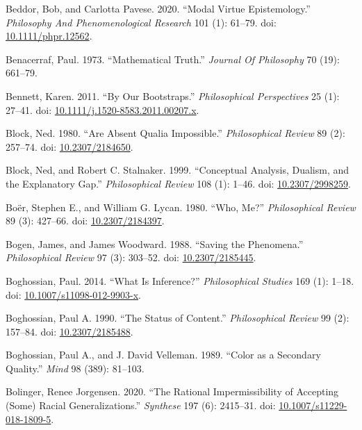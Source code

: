 \documentclass[
  10pt,
  letterpaper,
  DIV=11,
  numbers=noendperiod,
  twoside]{scrartcl}
\newlength{\cslhangindent}
\newenvironment{CSLReferences}[2] %
 {\begin{list}{}{%
  \setlength{\itemindent}{0pt}
  \setlength{\leftmargin}{0pt}
  \setlength{\parsep}{0pt}
  \ifodd #1
   \setlength{\leftmargin}{\cslhangindent}
   \setlength{\itemindent}{-1\cslhangindent}
  \fi
  \setlength{\itemsep}{#2\baselineskip}}}
 {\end{list}}
\begin{document}
\begin{CSLReferences}{1}{0}
Beddor, Bob, and Carlotta Pavese. 2020. {``Modal Virtue Epistemology.''}
\emph{Philosophy And Phenomenological Research} 101 (1): 61--79. doi:
\href{https://doi.org/10.1111/phpr.12562}{10.1111/phpr.12562}.

Benacerraf, Paul. 1973. {``Mathematical Truth.''} \emph{Journal Of
Philosophy} 70 (19): 661--79.

Bennett, Karen. 2011. {``By Our Bootstraps.''} \emph{Philosophical
Perspectives} 25 (1): 27--41. doi:
\href{https://doi.org/10.1111/j.1520-8583.2011.00207.x}{10.1111/j.1520-8583.2011.00207.x}.

Block, Ned. 1980. {``Are Absent Qualia Impossible.''}
\emph{Philosophical Review} 89 (2): 257--74. doi:
\href{https://doi.org/10.2307/2184650}{10.2307/2184650}.

Block, Ned, and Robert C. Stalnaker. 1999. {``Conceptual Analysis,
Dualism, and the Explanatory Gap.''} \emph{Philosophical Review} 108
(1): 1--46. doi:
\href{https://doi.org/10.2307/2998259}{10.2307/2998259}.

Boër, Stephen E., and William G. Lycan. 1980. {``Who, Me?''}
\emph{Philosophical Review} 89 (3): 427--66. doi:
\href{https://doi.org/10.2307/2184397}{10.2307/2184397}.

Bogen, James, and James Woodward. 1988. {``Saving the Phenomena.''}
\emph{Philosophical Review} 97 (3): 303--52. doi:
\href{https://doi.org/10.2307/2185445}{10.2307/2185445}.

Boghossian, Paul. 2014. {``What Is Inference?''} \emph{Philosophical
Studies} 169 (1): 1--18. doi:
\href{https://doi.org/10.1007/s11098-012-9903-x}{10.1007/s11098-012-9903-x}.

Boghossian, Paul A. 1990. {``The Status of Content.''}
\emph{Philosophical Review} 99 (2): 157--84. doi:
\href{https://doi.org/10.2307/2185488}{10.2307/2185488}.

Boghossian, Paul A., and J. David Velleman. 1989. {``Color as a
Secondary Quality.''} \emph{Mind} 98 (389): 81--103.

Bolinger, Renee Jorgensen. 2020. {``The Rational Impermissibility of
Accepting (Some) Racial Generalizations.''} \emph{Synthese} 197 (6):
2415--31. doi:
\href{https://doi.org/10.1007/s11229-018-1809-5}{10.1007/s11229-018-1809-5}.


\end{CSLReferences}
\end{document}
